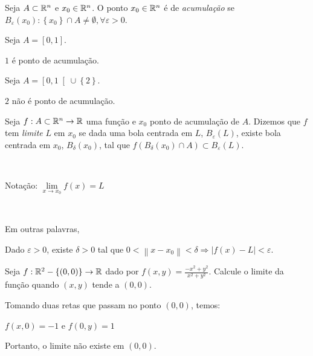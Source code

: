 \documentclass{book}
\begin{document}
\begin{defn}
Seja $A \subset \mathbb{R}^n$ e $x_0 \in \mathbb{R}^n$. O ponto $x_0 \in \mathbb{R}^n$ \'e de \textit{acumula\c c\~ao} se $B_\varepsilon  \left( {x_0 } \right):\left\{ {x_0 } \right\} \cap A \ne \emptyset ,\forall \varepsilon  > 0$.
\end{defn}

\begin{ex}
Seja $A = \left[ {0,1} \right]$.

$1$ \'e ponto de acumula\c c\~ao.

\end{ex}

\begin{ex}
Seja $A = \left[ {0,1} \right[ \cup \left\{ 2 \right\}$.

$2$ n\~ao \'e ponto de acumula\c c\~ao.
\end{ex}

\begin{defn}[Limite]
    Seja $f:A \subset \mathbb{R}^n  \to \mathbb{R}$ uma fun\c c\~ao e $x_0$ ponto de acumula\c c\~ao de $A$. Dizemos que $f$ tem \textit{limite} $L$ em $x_0$ se dada uma bola centrada em $L$, $B_\varepsilon  \left( L \right)$, existe bola centrada em $x_0$, $B_\delta  \left( {x_0 } \right)$, tal que $f\left( {B_\delta  \left( {x_0 } \right) \cap A} \right) \subset B_\varepsilon  \left( L \right)$.

\

Nota\c c\~ao: $\displaystyle \mathop {\lim }\limits_{x \to x_0 } f\left( x \right) = L$

\

Em outras palavras,

    Dado $\varepsilon  > 0$, existe $\delta  > 0$ tal que $0 < \left\| {x - x_0 } \right\| < \delta  \Rightarrow \left| {f\left( x \right) - L} \right| < \varepsilon$.
\end{defn}

\begin{ex}
    Seja $f:\mathbb{R}^2  - \left\{ {\left( {0,0} \right)} \right\} \to \mathbb{R}$ dado por $\displaystyle f\left( {x,y} \right) = \frac{{ - x^2  + y^2 }}{{x^2  + y^2 }}$. Calcule o limite da fun\c c\~ao quando $(x,y)$ tende a $(0,0)$.
\end{ex}

\begin{sol}
Tomando duas retas que passam no ponto $(0,0)$, temos:

$f\left( {x,0} \right) =  - 1$ e $f\left( {0,y} \right) = 1$

Portanto, o limite n\~ao existe em $(0,0)$.
\end{sol}
\end{document}
